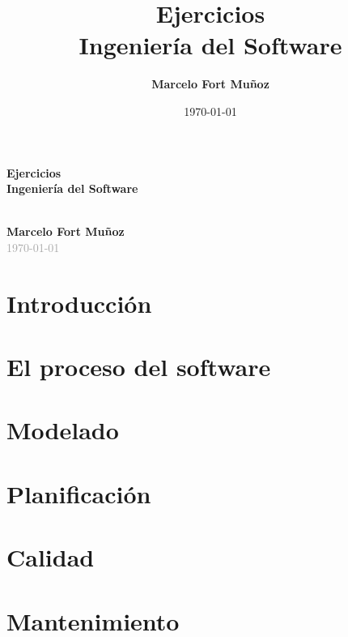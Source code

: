 \documentclass[a4paper,11pt]{article}
\title{\Huge\textbf{Ejercicios} \\ \Large\textcolor{primaryblue}{Ingeniería del Software}}
\author{\textbf{Marcelo Fort Muñoz}}
\date{\today}
\begin{document}
    \begin{titlepage}
        \centering
        \vspace*{2cm}

        {\Huge\textbf{Ejercicios}}\\[0.5cm]
        {\Large\textcolor{primaryblue}{\textbf{Ingeniería del Software}}}\\[2cm]

        \\[2cm]

        {\Large\textbf{Marcelo Fort Muñoz}}\\[1cm]
        {\large\textcolor{darkgray}{\today}}

        \vfill

    \end{titlepage}

    \tableofcontents
    \newpage


    \part{\textcolor{primaryblue}{Introducción}}\label{part:introduccion}
    


    \clearpage


    \part{\textcolor{primaryblue}{El proceso del software}}\label{part:el-proceso-del-software}
    


    \clearpage


    \part{\textcolor{primaryblue}{Modelado}}\label{part:modelado}
    


    \clearpage


    \part{\textcolor{primaryblue}{Planificación}}\label{part:planificacion}
    


    \clearpage


    \part{\textcolor{primaryblue}{Calidad}}\label{part:calidad}
    


    \clearpage


    \part{\textcolor{primaryblue}{Mantenimiento}}\label{part:mantenimiento}
    
\end{document}
